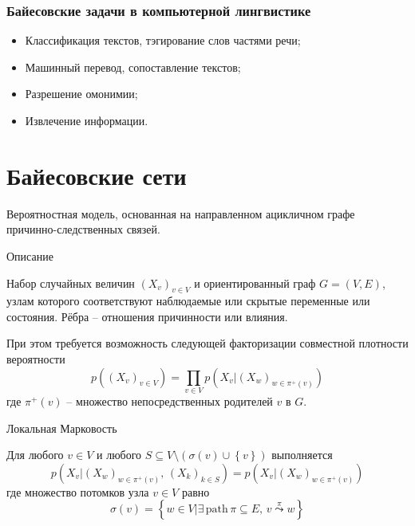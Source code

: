 \documentclass{beamer}
\newcommand{\obj}[1]{\left\{ #1 \right \}}
\newcommand{\brac}[1]{\left ( #1 \right )}
\newcommand{\induc}[1]{\left . #1 \right \vert}
\begin{document}
\begin{frame}\frametitle{Байесовские задачи в компьютерной лингвистике}

  \begin{block}

  \begin{itemize}
    \item Классификация текстов, тэгирование слов частями речи;
    \item Машинный перевод, сопоставление текстов;
    \item Разрешение омонимии;
    \item Извлечение информации.
  \end{itemize}
  \end{block}
\end{frame}



\section{Байесовские сети} %
\label{sec:bayesian_networks}

\begin{frame}
  \begin{block}
  
    Вероятностная модель, основанная на направленном ацикличном графе причинно-следственных связей.
  \end{block}
  \begin{block}{Описание}

    Набор случайных величин $\brac{X_v}_{v\in V}$ и ориентированный граф $G=(V,E)$, узлам которого соответствуют наблюдаемые или скрытые переменные или состояния. Рёбра -- отношения причинности или влияния.

    При этом требуется возможность следующей факторизации совместной плотности вероятности
    \[p\brac{\brac{X_v}_{v\in V}} = \prod_{v\in V} p\brac{\induc{X_v} \brac{X_w}_{w\in\pi^+(v)}}\]
    где $\pi^+(v)$ -- множество непосредственных родителей $v$ в $G$.
  \end{block}
\end{frame}

\begin{frame}
  \begin{block}{Локальная Марковость}

    Для любого $v\in V$ и любого $S\subseteq V\setminus\brac{\sigma(v)\cup\obj{v}}$ выполняется
    \[p\brac{\induc{X_v}\brac{X_w}_{w\in \pi^+(v)},\,\brac{X_k}_{k\in S} } = p\brac{\induc{X_v}\brac{X_w}_{w\in \pi^+(v)} }\]
    где множество потомков узла $v\in V$ равно
    \[\sigma(v) = \obj{\induc{w\in V} \exists\,\text{path}\,\pi\subseteq E,\, v\overset{\pi}{\leadsto}w}\]
    
  \end{block}

\end{frame}
\end{document}
